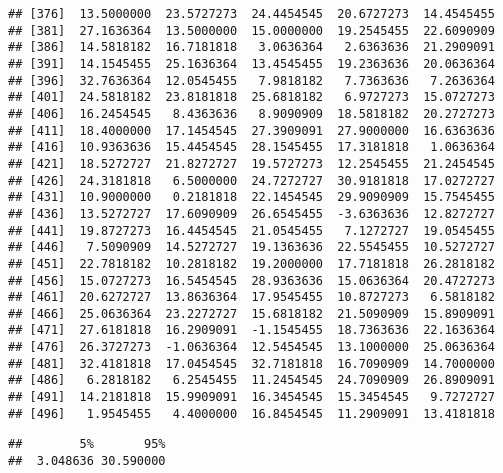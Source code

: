 \documentclass[]{book}
\newenvironment{Shaded}{\begin{snugshade}}{\end{snugshade}}
\newcommand{\CommentTok}[1]{\textcolor[rgb]{0.56,0.35,0.01}{\textit{#1}}}
\newcommand{\FloatTok}[1]{\textcolor[rgb]{0.00,0.00,0.81}{#1}}
\newcommand{\KeywordTok}[1]{\textcolor[rgb]{0.13,0.29,0.53}{\textbf{#1}}}
\newcommand{\NormalTok}[1]{#1}
\begin{document}
\begin{verbatim}
## [376]  13.5000000  23.5727273  24.4454545  20.6727273  14.4545455
## [381]  27.1636364  13.5000000  15.0000000  19.2545455  22.6090909
## [386]  14.5818182  16.7181818   3.0636364   2.6363636  21.2909091
## [391]  14.1545455  25.1636364  13.4545455  19.2363636  20.0636364
## [396]  32.7636364  12.0545455   7.9818182   7.7363636   7.2636364
## [401]  24.5818182  23.8181818  25.6818182   6.9727273  15.0727273
## [406]  16.2454545   8.4363636   8.9090909  18.5818182  20.2727273
## [411]  18.4000000  17.1454545  27.3909091  27.9000000  16.6363636
## [416]  10.9363636  15.4454545  28.1545455  17.3181818   1.0636364
## [421]  18.5272727  21.8272727  19.5727273  12.2545455  21.2454545
## [426]  24.3181818   6.5000000  24.7272727  30.9181818  17.0272727
## [431]  10.9000000   0.2181818  22.1454545  29.9090909  15.7545455
## [436]  13.5272727  17.6090909  26.6545455  -3.6363636  12.8272727
## [441]  19.8727273  16.4454545  21.0545455   7.1272727  19.0545455
## [446]   7.5090909  14.5272727  19.1363636  22.5545455  10.5272727
## [451]  22.7818182  10.2818182  19.2000000  17.7181818  26.2818182
## [456]  15.0727273  16.5454545  28.9363636  15.0636364  20.4727273
## [461]  20.6272727  13.8636364  17.9545455  10.8727273   6.5818182
## [466]  25.0636364  23.2272727  15.6818182  21.5090909  15.8909091
## [471]  27.6181818  16.2909091  -1.1545455  18.7363636  22.1636364
## [476]  26.3727273  -1.0636364  12.5454545  13.1000000  25.0636364
## [481]  32.4181818  17.0454545  32.7181818  16.7090909  14.7000000
## [486]   6.2818182   6.2545455  11.2454545  24.7090909  26.8909091
## [491]  14.2181818  15.9909091  16.3454545  15.3454545   9.7272727
## [496]   1.9545455   4.4000000  16.8454545  11.2909091  13.4181818
\end{verbatim}

\begin{Shaded}
\end{Shaded}

\begin{verbatim}
##        5%       95% 
##  3.048636 30.590000
\end{verbatim}

\begin{Shaded}
\end{Shaded}
\end{document}
